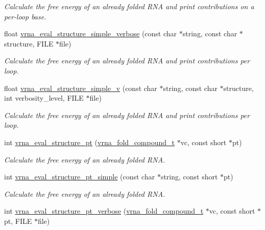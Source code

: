 \begin{DoxyCompactItemize}
\begin{DoxyCompactList}\small\item\em Calculate the free energy of an already folded R\+NA and print contributions on a per-\/loop base. \end{DoxyCompactList}\item 
float \hyperlink{group__eval_ga4c2895a7dcd756ef2dc7f76db7c4c53e}{vrna\+\_\+eval\+\_\+structure\+\_\+simple\+\_\+verbose} (const char $\ast$string, const char $\ast$structure, F\+I\+LE $\ast$file)
\begin{DoxyCompactList}\small\item\em Calculate the free energy of an already folded R\+NA and print contributions per loop. \end{DoxyCompactList}\item 
float \hyperlink{group__eval_gaddb30ac265f1a39557170e7acac4930f}{vrna\+\_\+eval\+\_\+structure\+\_\+simple\+\_\+v} (const char $\ast$string, const char $\ast$structure, int verbosity\+\_\+level, F\+I\+LE $\ast$file)
\begin{DoxyCompactList}\small\item\em Calculate the free energy of an already folded R\+NA and print contributions per loop. \end{DoxyCompactList}\item 
int \hyperlink{group__eval_gadbd09372ddfd7a450bbd590c96a6bfe4}{vrna\+\_\+eval\+\_\+structure\+\_\+pt} (\hyperlink{group__fold__compound_ga1b0cef17fd40466cef5968eaeeff6166}{vrna\+\_\+fold\+\_\+compound\+\_\+t} $\ast$vc, const short $\ast$pt)
\begin{DoxyCompactList}\small\item\em Calculate the free energy of an already folded R\+NA. \end{DoxyCompactList}\item 
int \hyperlink{group__eval_ga0bba59b4d6e53461088666ff4aece7b0}{vrna\+\_\+eval\+\_\+structure\+\_\+pt\+\_\+simple} (const char $\ast$string, const short $\ast$pt)
\begin{DoxyCompactList}\small\item\em Calculate the free energy of an already folded R\+NA. \end{DoxyCompactList}\item 
int \hyperlink{group__eval_ga8a517cfeeae8c376ae7b1e0c401d38b4}{vrna\+\_\+eval\+\_\+structure\+\_\+pt\+\_\+verbose} (\hyperlink{group__fold__compound_ga1b0cef17fd40466cef5968eaeeff6166}{vrna\+\_\+fold\+\_\+compound\+\_\+t} $\ast$vc, const short $\ast$pt, F\+I\+LE $\ast$file)

\end{DoxyCompactItemize}
